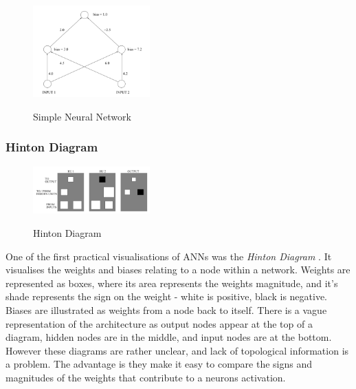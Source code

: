 \documentclass[a4paper,11pt,titlepage]{article}
\begin{document}
	 	\begin{figure}[H]
    			\centering	
			{{\includegraphics[width=0.4\textwidth]
    				{img/craven_simple_net.png} 
    			}}%
    			\caption{Simple Neural Network}%
    		\label{fig:simplenet}
	\end{figure} 	
		
\subsubsection{Hinton Diagram}

		 		
 	\begin{figure}[H]
    			\centering	
			{{\includegraphics[width=0.4\textwidth]
    				{img/craven_hinton.png} 
    			}}%
    			\caption{Hinton Diagram}%
    		\label{fig:simple}
	\end{figure} 
 		
		One of the first practical visualisations of ANNs was the \textit{Hinton Diagram} \cite{Hinton1986}. It visualises the weights and biases relating to a node within a network. Weights are represented as boxes, where its area represents the weights magnitude, and it's shade represents the sign on the weight - white is positive, black is negative. Biases are illustrated as weights from a node back to itself. There is a vague representation of the architecture as output nodes appear at the top of a diagram, hidden nodes are in the middle, and input nodes are at the bottom. However these diagrams are rather unclear, and lack of topological information is a problem. The advantage is they make it easy to compare the signs and magnitudes of the weights that contribute to a neurons activation.
		\\\
		\\\
		
\end{document}
